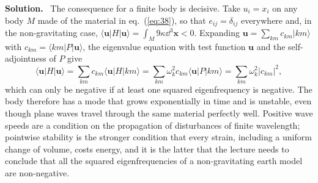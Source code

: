 \documentclass[a4paper,12pt]{paper}
\newenvironment{solution}{\par\noindent\textbf{Solution.}\ }{\par\medskip}
\begin{document}
\begin{solution}
The consequence for a finite body is decisive. Take $u_{i}=x_{i}$ on any body $M$ made of the material
in eq.~(\ref{eq:38}), so that $e_{ij}=\delta_{ij}$ everywhere and, in the non-gravitating case,
$\langle\mathbf{u}|H|\mathbf{u}\rangle=\int_{M}9\kappa\dd^{3}\mathbf{x}<0$. Expanding
$\mathbf{u}=\sum_{km}c_{km}|km\rangle$ with $c_{km}=\langle km|P|\mathbf{u}\rangle$, the eigenvalue
equation with test function $\mathbf{u}$ and the self-adjointness of $P$ give
\begin{equation}
\langle\mathbf{u}|H|\mathbf{u}\rangle=\sum_{km}c_{km}\langle\mathbf{u}|H|km\rangle
=\sum_{km}\omega_{k}^{2}c_{km}\langle\mathbf{u}|P|km\rangle=\sum_{km}\omega_{k}^{2}|c_{km}|^{2},
\label{eq:40}
\end{equation}
which can only be negative if at least one squared eigenfrequency is negative. The body therefore has a
mode that grows exponentially in time and is unstable, even though plane waves travel through the same
material perfectly well. Positive wave speeds are a condition on the propagation of disturbances of
finite wavelength; pointwise stability is the stronger condition that every strain, including a uniform
change of volume, costs energy, and it is the latter that the lecture needs to conclude that all the
squared eigenfrequencies of a non-gravitating earth model are non-negative.
\end{solution}
\end{document}
